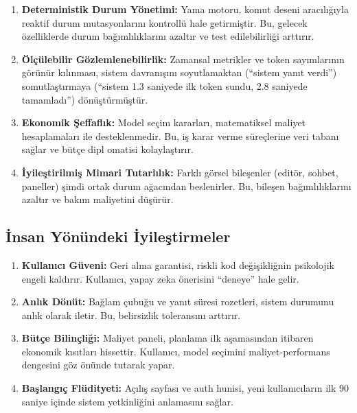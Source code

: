 \documentclass[12pt,a4paper]{article}
\begin{document}
\begin{enumerate}[leftmargin=*]
  \item \textbf{Deterministik Durum Yönetimi:} Yama motoru, komut deseni aracılığıyla reaktif durum mutasyonlarını kontrollü hale getirmiştir. Bu, gelecek özelliklerde durum bağımlılıklarını azaltır ve test edilebilirliği arttırır.
  
  \item \textbf{Ölçülebilir Gözlemlenebilirlik:} Zamansal metrikler ve token sayımlarının görünür kılınması, sistem davranışını soyutlamaktan (``sistem yanıt verdi'') somutlaştırmaya (``sistem 1.3 saniyede ilk token sundu, 2.8 saniyede tamamladı'') dönüştürmüştür.
  
  \item \textbf{Ekonomik Şeffaflık:} Model seçim kararları, matematiksel maliyet hesaplamaları ile desteklenmedir. Bu, iş karar verme süreçlerine veri tabanı sağlar ve bütçe dipl
omatisi kolaylaştırır.
  
  \item \textbf{İyileştirilmiş Mimari Tutarlılık:} Farklı görsel bileşenler (editör, sohbet, paneller) şimdi ortak durum ağacından beslenirler. Bu, bileşen bağımlılıklarını azaltır ve bakım maliyetini düşürür.
\end{enumerate}

\subsection*{İnsan Yönündeki İyileştirmeler}

\begin{enumerate}[leftmargin=*]
  \item \textbf{Kullanıcı Güveni:} Geri alma garantisi, riskli kod değişikliğnin psikolojik engeli kaldırır. Kullanıcı, yapay zeka önerisini ``deneye'' hale gelir.
  
  \item \textbf{Anlık Dönüt:} Bağlam çubuğu ve yanıt süresi rozetleri, sistem durumunu anlık olarak iletir. Bu, belirsizlik toleransını arttırır.
  
  \item \textbf{Bütçe Bilinçliği:} Maliyet paneli, planlama ilk aşamasından itibaren ekonomik kısıtları hissettir. Kullanıcı, model seçimini maliyet-performans dengesini göz önünde tutarak yapar.
  
  \item \textbf{Başlangıç Flüdityeti:} Açılış sayfası ve auth hunisi, yeni kullanıcıların ilk 90 saniye içinde sistem yetkinliğini anlamasını sağlar.
\end{enumerate}
\end{document}
